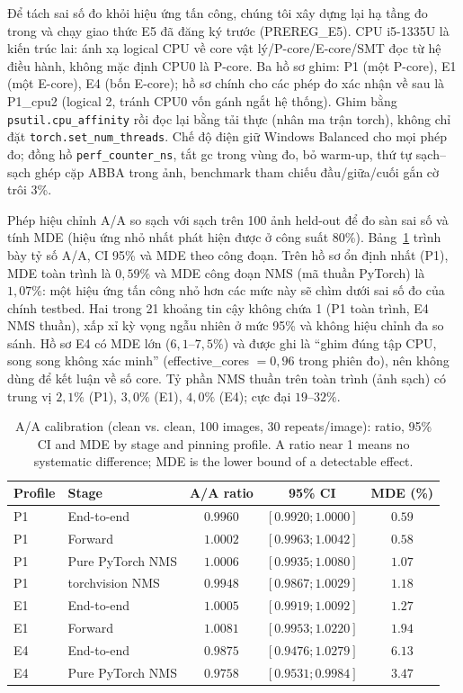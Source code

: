 \documentclass[a4paper,fleqn]{cas-dc}
\begin{document}
Để tách sai số đo khỏi hiệu ứng tấn công, chúng tôi xây dựng lại hạ tầng đo trong  và chạy giao thức E5 đã đăng ký trước (PREREG\_E5). CPU i5-1335U là kiến trúc lai: ánh xạ logical CPU về core vật lý/P-core/E-core/SMT đọc từ hệ điều hành, không mặc định CPU0 là P-core. Ba hồ sơ ghim: P1 (một P-core), E1 (một E-core), E4 (bốn E-core); hồ sơ chính cho các phép đo xác nhận về sau là P1\_cpu2 (logical 2, tránh CPU0 vốn gánh ngắt hệ thống). Ghim bằng \texttt{psutil.cpu\_affinity} rồi đọc lại bằng tải thực (nhân ma trận torch), không chỉ đặt \texttt{torch.set\_num\_threads}. Chế độ điện giữ Windows Balanced cho mọi phép đo; đồng hồ \texttt{perf\_counter\_ns}, tắt gc trong vùng đo, bỏ warm-up, thứ tự sạch--sạch ghép cặp ABBA trong ảnh, benchmark tham chiếu đầu/giữa/cuối gắn cờ trôi 3\%.

Phép hiệu chỉnh A/A so sạch với sạch trên 100 ảnh held-out để đo sàn sai số và tính MDE (hiệu ứng nhỏ nhất phát hiện được ở công suất 80\%). Bảng~\ref{tab:aa} trình bày tỷ số A/A, CI 95\% và MDE theo công đoạn. Trên hồ sơ ổn định nhất (P1), MDE toàn trình là $0{,}59\%$ và MDE công đoạn NMS (mã thuần PyTorch) là $1{,}07\%$: một hiệu ứng tấn công nhỏ hơn các mức này sẽ chìm dưới sai số đo của chính testbed. Hai trong 21 khoảng tin cậy không chứa 1 (P1 toàn trình, E4 NMS thuần), xấp xỉ kỳ vọng ngẫu nhiên ở mức 95\% và không hiệu chỉnh đa so sánh. Hồ sơ E4 có MDE lớn ($6{,}1$--$7{,}5\%$) và được ghi là ``ghim đúng tập CPU, song song không xác minh'' (effective\_cores $=0{,}96$ trong phiên đo), nên không dùng để kết luận về số core. Tỷ phần NMS thuần trên toàn trình (ảnh sạch) có trung vị $2{,}1\%$ (P1), $3{,}0\%$ (E1), $4{,}0\%$ (E4); cực đại $19$--$32\%$.

\begin{table}[t]
\centering
\small
\caption{A/A calibration (clean vs. clean, 100 images, 30 repeats/image): ratio, 95\% CI and MDE by stage and pinning profile. A ratio near 1 means no systematic difference; MDE is the lower bound of a detectable effect.}
\begin{tabularx}{\textwidth}{@{}l l c c c@{}}
\toprule
\textbf{Profile} & \textbf{Stage} & \textbf{A/A ratio} & \textbf{95\% CI} & \textbf{MDE (\%)} \\
\midrule
P1 & End-to-end        & $0.9960$ & $[0.9920;1.0000]$ & $0.59$ \\
P1 & Forward           & $1.0002$ & $[0.9963;1.0042]$ & $0.58$ \\
P1 & Pure PyTorch NMS & $1.0006$ & $[0.9935;1.0080]$ & $1.07$ \\
P1 & torchvision NMS   & $0.9948$ & $[0.9867;1.0029]$ & $1.18$ \\
E1 & End-to-end        & $1.0005$ & $[0.9919;1.0092]$ & $1.27$ \\
E1 & Forward           & $1.0081$ & $[0.9953;1.0220]$ & $1.94$ \\
E4 & End-to-end        & $0.9875$ & $[0.9476;1.0279]$ & $6.13$ \\
E4 & Pure PyTorch NMS & $0.9758$ & $[0.9531;0.9984]$ & $3.47$ \\
\bottomrule
\end{tabularx}
\label{tab:aa}
\end{table}
\end{document}
